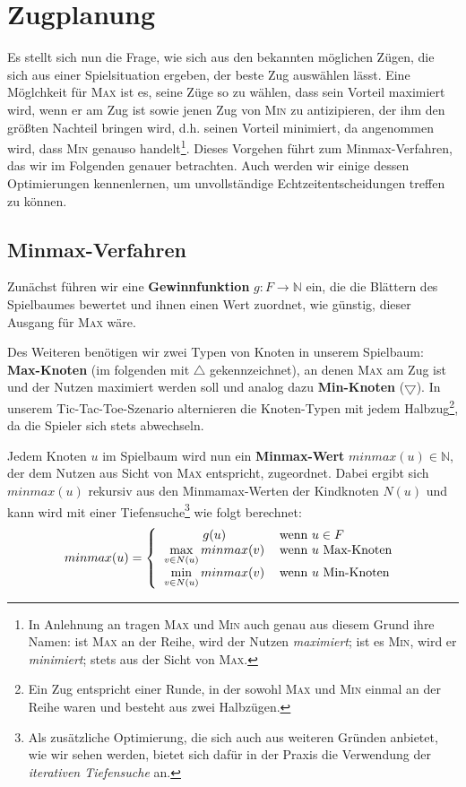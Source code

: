 \documentclass[a4paper,twoside]{scrartcl}
\begin{document}
\section{Zugplanung}

Es stellt sich nun die Frage, wie sich aus den bekannten möglichen Zügen, die sich aus einer Spielsituation ergeben, der beste Zug auswählen lässt. Eine Möglchkeit für \textsc{Max} ist es, seine Züge so zu wählen, dass sein Vorteil maximiert wird, wenn er am Zug ist sowie jenen Zug von \textsc{Min} zu antizipieren, der ihm den größten Nachteil bringen wird, d.h. seinen Vorteil minimiert, da angenommen wird, dass \textsc{Min} genauso handelt\footnote{In Anlehnung an \cite{R:2012} tragen \textsc{Max} und \textsc{Min} auch genau aus diesem Grund ihre Namen: ist \textsc{Max} an der Reihe, wird der Nutzen \textit{maximiert}; ist es \textsc{Min}, wird er \textit{minimiert}; stets aus der Sicht von \textsc{Max}.}. Dieses Vorgehen führt zum Minmax-Verfahren, das wir im Folgenden genauer betrachten. Auch werden wir einige dessen Optimierungen kennenlernen, um unvollständige Echtzeitentscheidungen treffen zu können.


\subsection{Minmax-Verfahren}

Zunächst führen wir eine \textbf{Gewinnfunktion} $g: F \to \mathbb{N}$ ein, die die Blättern des Spielbaumes bewertet und ihnen einen Wert zuordnet, wie günstig, dieser Ausgang für \textsc{Max} wäre.

Des Weiteren benötigen wir zwei Typen von Knoten in unserem Spielbaum: \textbf{Max-Knoten} (im folgenden mit $\bigtriangleup$ gekennzeichnet), an denen \textsc{Max} am Zug ist und der Nutzen maximiert werden soll und analog dazu \textbf{Min-Knoten} ($\bigtriangledown$). In unserem Tic-Tac-Toe-Szenario alternieren die Knoten-Typen mit jedem Halbzug\footnote{Ein Zug entspricht einer Runde, in der sowohl \textsc{Max} und \textsc{Min} einmal an der Reihe waren und besteht aus zwei Halbzügen.}, da die Spieler sich stets abwechseln. 

Jedem Knoten $u$ im Spielbaum wird nun ein \textbf{Minmax-Wert} $minmax(u) \in \mathbb{N}$, der dem Nutzen aus Sicht von \textsc{Max} entspricht, zugeordnet. Dabei ergibt sich $minmax(u)$ rekursiv aus den Minmamax-Werten der Kindknoten $N(u)$ und kann wird mit einer Tiefensuche\footnote{Als zusätzliche Optimierung, die sich auch aus weiteren Gründen anbietet, wie wir sehen werden, bietet sich dafür in der Praxis die Verwendung der \textit{iterativen Tiefensuche} an.} wie folgt berechnet:
\[
  minmax(u) = \left\{
  \begin{tabular}{cl}
    $g(u)$ & wenn $u \in F$\\
    $\max\limits_{v \in N(u)} minmax(v)$ & wenn $u$ Max-Knoten\\
    $\min\limits_{v \in N(u)} minmax(v)$ & wenn $u$ Min-Knoten
  \end{tabular}\right.
\]
\end{document}
